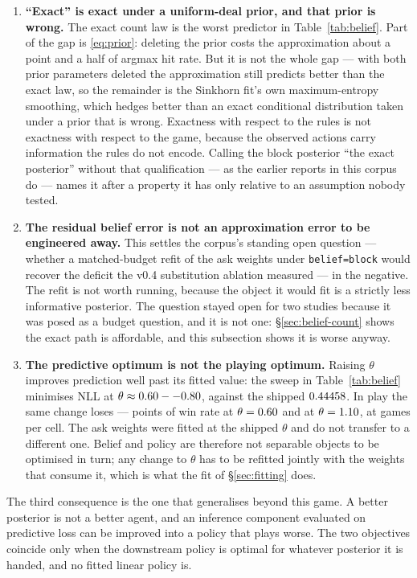 \begin{enumerate}
  \item \textbf{``Exact'' is exact under a uniform-deal prior, and that prior is
        wrong.} The exact count law is the worst predictor in
        Table~\ref{tab:belief}. Part of the gap is \eqref{eq:prior}: deleting
        the prior costs the approximation about a point and a half of argmax hit
        rate. But it is not the whole gap --- with both prior parameters deleted
        the approximation still predicts better than the exact law, so the
        remainder is the Sinkhorn fit's own maximum-entropy smoothing, which
        hedges better than an exact conditional distribution taken under a prior
        that is wrong. Exactness with respect to the
        rules is not exactness with respect to the game, because the observed
        actions carry information the rules do not encode. Calling the block
        posterior ``the exact posterior'' without that qualification --- as the
        earlier reports in this corpus do --- names it after a property it has
        only relative to an assumption nobody tested.
  \item \textbf{The residual belief error is not an approximation error to be
        engineered away.} This settles the corpus's standing open question
        --- whether a matched-budget refit of the ask weights under
        \texttt{belief=block} would recover the deficit the v0.4 substitution
        ablation measured --- in the negative. The refit is not worth running,
        because the object it would fit is a strictly less informative posterior.
        The question stayed open for two studies because it was posed as a
        budget question, and it is not one: \S\ref{sec:belief-count} shows the
        exact path is affordable, and this subsection shows it is worse anyway.
  \item \textbf{The predictive optimum is not the playing optimum.} Raising
        $\theta$ improves prediction well past its fitted value: the sweep in
        Table~\ref{tab:belief} minimises NLL at $\theta \approx
        0.60--0.80{}$, against the shipped $0.44458{}$. In
        play the same change loses --- \numThetaSixtyCost{} points of win rate at
        $\theta = 0.60{}$ and \numThetaElevenCost{} at $\theta =
        1.10{}$, at \numThetaTrialN{} games per cell. The ask weights were fitted at the
        shipped $\theta$ and do not transfer to a different one. Belief and
        policy are therefore not separable objects to be optimised in turn; any
        change to $\theta$ has to be refitted jointly with the weights that
        consume it, which is what the fit of \S\ref{sec:fitting} does.
\end{enumerate}

The third consequence is the one that generalises beyond this game. A better
posterior is not a better agent, and an inference component evaluated on
predictive loss can be improved into a policy that plays worse. The two
objectives coincide only when the downstream policy is optimal for whatever
posterior it is handed, and no fitted linear policy is.
